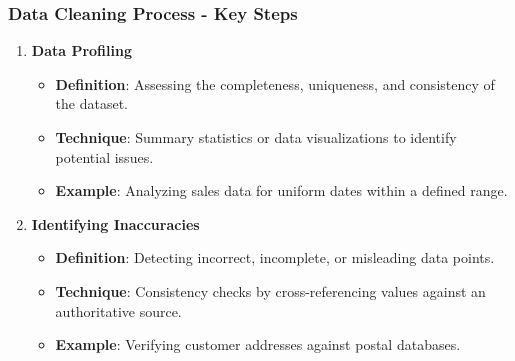 \documentclass[aspectratio=169]{beamer}
\begin{document}
\begin{frame}[fragile]
    \frametitle{Data Cleaning Process - Key Steps}
    \begin{enumerate}
        \item \textbf{Data Profiling}
            \begin{itemize}
                \item \textbf{Definition}: Assessing the completeness, uniqueness, and consistency of the dataset.
                \item \textbf{Technique}: Summary statistics or data visualizations to identify potential issues.
                \item \textbf{Example}: Analyzing sales data for uniform dates within a defined range.
            \end{itemize}
        
        \item \textbf{Identifying Inaccuracies}
            \begin{itemize}
                \item \textbf{Definition}: Detecting incorrect, incomplete, or misleading data points.
                \item \textbf{Technique}: Consistency checks by cross-referencing values against an authoritative source.
                \item \textbf{Example}: Verifying customer addresses against postal databases.
            \end{itemize}
    \end{enumerate}
\end{frame}
\end{document}
